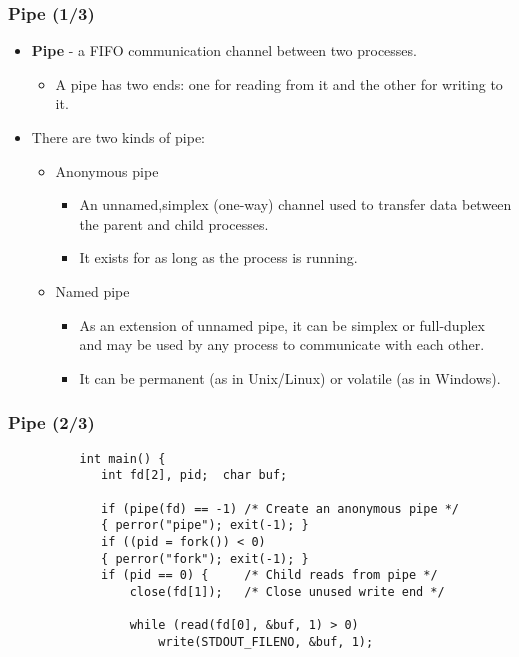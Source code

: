 \documentclass[CJKutf8,dvipsnames,table]{beamer}
\begin{document}
\begin{CJK*}{UTF8}{song}
  \begin{frame}
  \frametitle{Pipe (1/3)} \pause
  \begin{itemize}
  \item \textbf{Pipe} \pause - a FIFO communication channel between two processes.  \pause
    \begin{itemize}
    \item A pipe has two ends: one for reading from it and the other for writing to it.  \pause
    \end{itemize}
  \item There are two kinds of pipe:  \pause
    \begin{itemize}
    \item Anonymous pipe  \pause
      \begin{itemize}
      \item An unnamed,simplex (one-way) channel used to transfer data between the parent and child processes.  \pause
      \item It exists for as long as the process is running.  \pause
      \end{itemize}
    \item Named pipe  \pause
      \begin{itemize}
      \item As an extension of unnamed pipe, it can be simplex or full-duplex and may be used by any process to communicate with each other.  \pause
      \item It can be permanent (as in Unix/Linux) or volatile (as in Windows). 
      \end{itemize}
    \end{itemize}
  \end{itemize}
  \end{frame}

  \begin{frame}[fragile]%
  \frametitle{Pipe (2/3)} \pause
\begin{lstlisting}
          int main() {
             int fd[2], pid;  char buf;
             
             if (pipe(fd) == -1) /* Create an anonymous pipe */
             { perror("pipe"); exit(-1); }
             if ((pid = fork()) < 0)
             { perror("fork"); exit(-1); }
             if (pid == 0) {     /* Child reads from pipe */
                 close(fd[1]);   /* Close unused write end */

                 while (read(fd[0], &buf, 1) > 0)
                     write(STDOUT_FILENO, &buf, 1);


\end{lstlisting}
\end{frame}
\end{CJK*}
\end{document}
